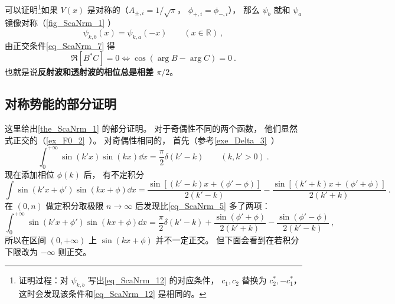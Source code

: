 可以证明\footnote{证明过程：对 $\psi_{k,b}$ 写出\autoref{eq_ScaNrm_12} 的对应条件， $c_1,c_2$ 替换为 $c_2^*, -c_1^*$， 这时会发现该条件和\autoref{eq_ScaNrm_12} 是相同的。}如果 $V(x)$ 是对称的（$A_{\pm,i} = 1/\sqrt{\pi}$， $\phi_{+,i}=\phi_{-,i}$）， 那么 $\psi_b$ 就和 $\psi_a$ 镜像对称（\autoref{fig_ScaNrm_1} ）
\begin{equation}
\psi_{k,b}(x) = \psi_{k,a}(-x) \qquad (x\in \mathbb{R})~,
\end{equation}
由正交条件\autoref{eq_ScaNrm_7} 得
\begin{equation}\label{eq_ScaNrm_11}
\Re[B^*C] = 0 \Longleftrightarrow \cos(\arg{B} - \arg{C}) = 0~.
\end{equation}
也就是说\textbf{反射波和透射波的相位总是相差 $\pi/2$}。


\subsection{对称势能的部分证明}
这里给出\autoref{the_ScaNrm_1} 的部分证明。 对于奇偶性不同的两个函数， 他们显然式正交的（\autoref{ex_F0_2}~）。 对奇偶性相同的， 首先（参考\autoref{exe_Delta_3}~）
\begin{equation}\label{eq_ScaNrm_5}
\int_{0}^{+\infty} \sin(k'x)\sin(kx)\dd{x} = \frac{\pi}{2}\delta(k'-k)
\qquad (k, k' > 0)~.
\end{equation}
现在添加相位 $\phi(k)$ 后， 有不定积分
\begin{equation}
\int \sin(k'x+\phi')\sin(kx+\phi) \dd{x} = \frac{\sin[(k'-k)x + (\phi'-\phi)]}{2(k'-k)}
- \frac{\sin[(k'+k)x+(\phi'+\phi)]}{2(k'+k)}~.
\end{equation}
在 $(0,n)$ 做定积分取极限 $n\to\infty$ 后发现比\autoref{eq_ScaNrm_5} 多了两项：
\begin{equation}
\int_{0}^{+\infty} \sin(k'x+\phi')\sin(kx+\phi) \dd{x} = \frac{\pi}{2}\delta(k'-k)
+ \frac{\sin(\phi'+\phi)}{2(k'+k)} - \frac{\sin(\phi'-\phi)}{2(k'-k)}~,
\end{equation}
所以在区间 $(0, +\infty)$ 上 $\sin(kx+\phi)$ 并不一定正交。 但下面会看到在若积分下限改为 $-\infty$ 则正交。

